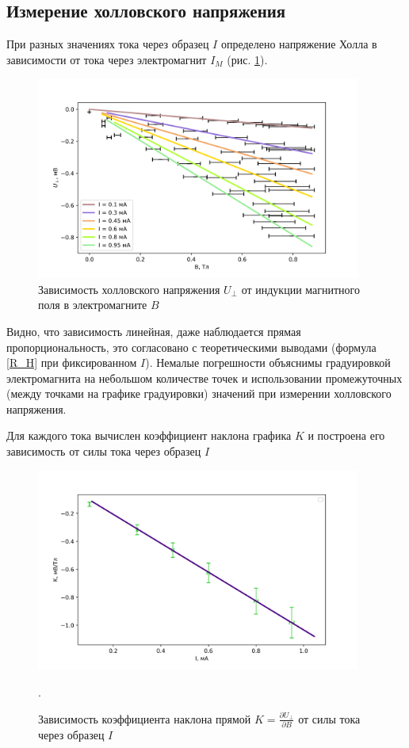 \documentclass[a4paper,12pt]{article} %
\begin{document}
\subsection*{Измерение холловского напряжения}
При разных значениях тока через образец $I$ определено напряжение Холла в зависимости от тока через электромагнит $I_M$ (рис. \ref{U(B)}).
\begin{figure}[h!]
\begin{center}
\includegraphics[width=0.95\textwidth]{E(B)}
\caption{Зависимость холловского напряжения $U_\perp$ от индукции магнитного поля в электромагните $B$} \label{U(B)}
\end{center}
\end{figure} 
Видно, что зависимость линейная, даже наблюдается прямая пропорциональность, это согласовано с теоретическими выводами (формула \ref{R_H} при фиксированном $I$). Немалые погрешности объяснимы градуировкой электромагнита на небольшом количестве точек и использовании промежуточных (между точками на графике градуировки) значений при измерении холловского напряжения.
 
Для каждого тока вычислен коэффициент наклона графика $K$ и построена его зависимость от силы тока через образец $I$ 
\begin{figure}[h!]
\begin{center}
\includegraphics[width=0.95\textwidth]{K(I)}
\caption{Зависимость коэффициента наклона прямой $K=\frac{\partial U_\perp}{\partial B}$ от силы тока через образец $I$} \label{K(I)}.
\end{center}
\end{figure} 
\end{document}
